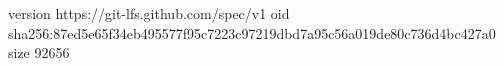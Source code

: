 version https://git-lfs.github.com/spec/v1
oid sha256:87ed5e65f34eb495577f95c7223c97219dbd7a95c56a019de80c736d4bc427a0
size 92656
